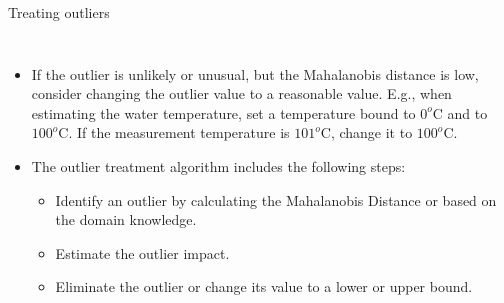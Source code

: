 \begin{frame}{Treating outliers}
\begin{columns}
\begin{itemize}
        \item If the outlier is unlikely or unusual, but the Mahalanobis distance is low, consider changing the outlier value to a reasonable value. E.g., when estimating the water temperature, set a temperature bound to $0^o$C and to $100^o$C. If the measurement temperature is $101^o$C, change it to $100^o$C.
        \item The outlier treatment algorithm includes the following steps:
        \begin{itemize}
            \item Identify an outlier by calculating the Mahalanobis Distance or based on the domain knowledge.
            \item Estimate the outlier impact.
            \item Eliminate the outlier or change its value to a lower or upper bound.
        \end{itemize}

        \end{itemize}
\end{columns}
\end{frame}



